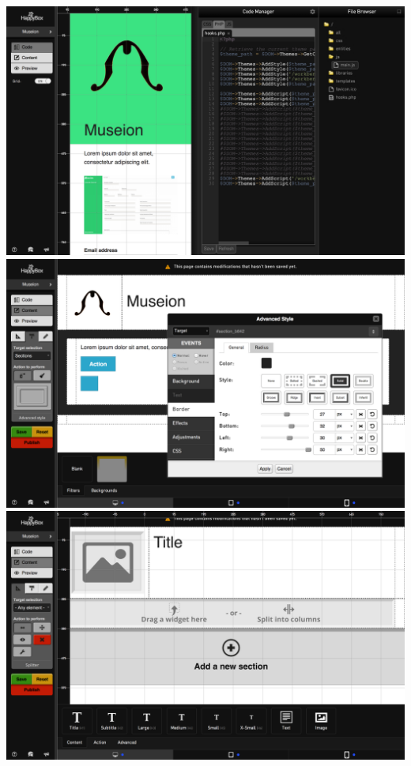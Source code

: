 \documentclass[11pt, a4paper ]{article}
\begin{document}
\begin{spacing}{1.5}
	\includegraphics[width=\textwidth]{images/HBscreen/7}
	\includegraphics[width=\textwidth]{images/HBscreen/8}
	\includegraphics[width=\textwidth]{images/HBscreen/9}

\end{spacing}
\end{document}
